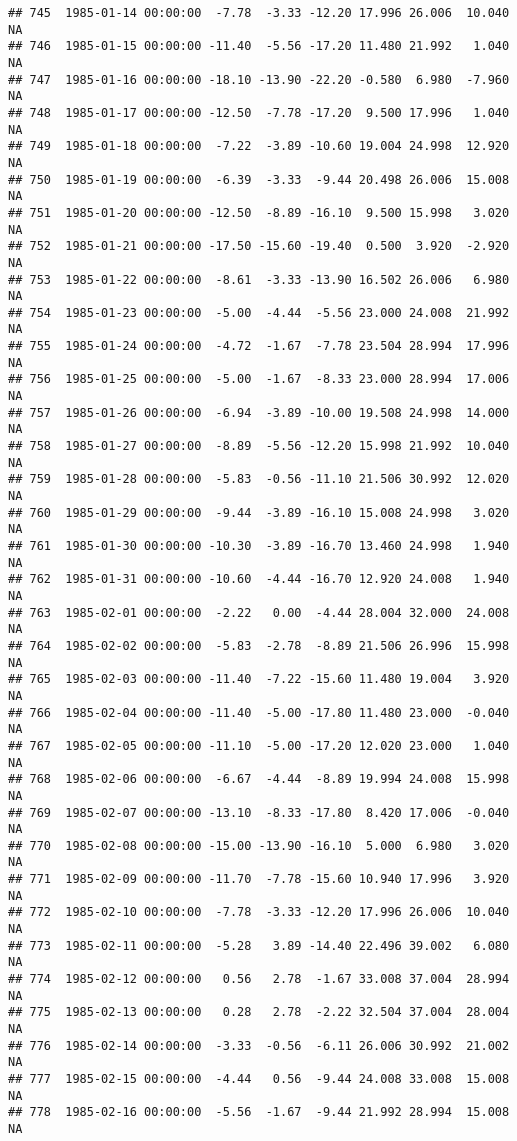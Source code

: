 \documentclass{article}\usepackage{graphicx, color}
\makeatletter
\newenvironment{kframe}{%
 \def\at@end@of@kframe{}%
 \ifinner\ifhmode%
  \def\at@end@of@kframe{\end{minipage}}%
  \begin{minipage}{\columnwidth}%
 \fi\fi%
 \def\FrameCommand##1{\hskip\@totalleftmargin \hskip-\fboxsep
 \colorbox{shadecolor}{##1}\hskip-\fboxsep
     \hskip-\linewidth \hskip-\@totalleftmargin \hskip\columnwidth}%
 \MakeFramed {\advance\hsize-\width
   \@totalleftmargin\z@ \linewidth\hsize
   \@setminipage}}%
 {\par\unskip\endMakeFramed%
 \at@end@of@kframe}
\newenvironment{knitrout}{}{} %
\makeatother
\begin{document}
\begin{knitrout}
\begin{kframe}
\begin{verbatim}
## 745  1985-01-14 00:00:00  -7.78  -3.33 -12.20 17.996 26.006  10.040     NA
## 746  1985-01-15 00:00:00 -11.40  -5.56 -17.20 11.480 21.992   1.040     NA
## 747  1985-01-16 00:00:00 -18.10 -13.90 -22.20 -0.580  6.980  -7.960     NA
## 748  1985-01-17 00:00:00 -12.50  -7.78 -17.20  9.500 17.996   1.040     NA
## 749  1985-01-18 00:00:00  -7.22  -3.89 -10.60 19.004 24.998  12.920     NA
## 750  1985-01-19 00:00:00  -6.39  -3.33  -9.44 20.498 26.006  15.008     NA
## 751  1985-01-20 00:00:00 -12.50  -8.89 -16.10  9.500 15.998   3.020     NA
## 752  1985-01-21 00:00:00 -17.50 -15.60 -19.40  0.500  3.920  -2.920     NA
## 753  1985-01-22 00:00:00  -8.61  -3.33 -13.90 16.502 26.006   6.980     NA
## 754  1985-01-23 00:00:00  -5.00  -4.44  -5.56 23.000 24.008  21.992     NA
## 755  1985-01-24 00:00:00  -4.72  -1.67  -7.78 23.504 28.994  17.996     NA
## 756  1985-01-25 00:00:00  -5.00  -1.67  -8.33 23.000 28.994  17.006     NA
## 757  1985-01-26 00:00:00  -6.94  -3.89 -10.00 19.508 24.998  14.000     NA
## 758  1985-01-27 00:00:00  -8.89  -5.56 -12.20 15.998 21.992  10.040     NA
## 759  1985-01-28 00:00:00  -5.83  -0.56 -11.10 21.506 30.992  12.020     NA
## 760  1985-01-29 00:00:00  -9.44  -3.89 -16.10 15.008 24.998   3.020     NA
## 761  1985-01-30 00:00:00 -10.30  -3.89 -16.70 13.460 24.998   1.940     NA
## 762  1985-01-31 00:00:00 -10.60  -4.44 -16.70 12.920 24.008   1.940     NA
## 763  1985-02-01 00:00:00  -2.22   0.00  -4.44 28.004 32.000  24.008     NA
## 764  1985-02-02 00:00:00  -5.83  -2.78  -8.89 21.506 26.996  15.998     NA
## 765  1985-02-03 00:00:00 -11.40  -7.22 -15.60 11.480 19.004   3.920     NA
## 766  1985-02-04 00:00:00 -11.40  -5.00 -17.80 11.480 23.000  -0.040     NA
## 767  1985-02-05 00:00:00 -11.10  -5.00 -17.20 12.020 23.000   1.040     NA
## 768  1985-02-06 00:00:00  -6.67  -4.44  -8.89 19.994 24.008  15.998     NA
## 769  1985-02-07 00:00:00 -13.10  -8.33 -17.80  8.420 17.006  -0.040     NA
## 770  1985-02-08 00:00:00 -15.00 -13.90 -16.10  5.000  6.980   3.020     NA
## 771  1985-02-09 00:00:00 -11.70  -7.78 -15.60 10.940 17.996   3.920     NA
## 772  1985-02-10 00:00:00  -7.78  -3.33 -12.20 17.996 26.006  10.040     NA
## 773  1985-02-11 00:00:00  -5.28   3.89 -14.40 22.496 39.002   6.080     NA
## 774  1985-02-12 00:00:00   0.56   2.78  -1.67 33.008 37.004  28.994     NA
## 775  1985-02-13 00:00:00   0.28   2.78  -2.22 32.504 37.004  28.004     NA
## 776  1985-02-14 00:00:00  -3.33  -0.56  -6.11 26.006 30.992  21.002     NA
## 777  1985-02-15 00:00:00  -4.44   0.56  -9.44 24.008 33.008  15.008     NA
## 778  1985-02-16 00:00:00  -5.56  -1.67  -9.44 21.992 28.994  15.008     NA

\end{verbatim}
\end{kframe}
\end{knitrout}
\end{document}
